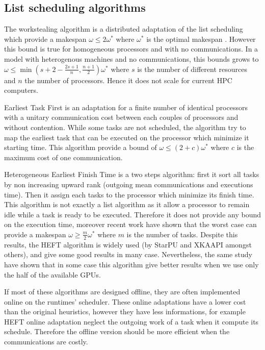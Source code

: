 \documentclass[10pt, conference, compsocconf,pdftex,dvipsnames]{IEEEtran}
\begin{document}
\subsection{List scheduling algorithms}

The workstealing algorithm is a distributed adaptation of the list scheduling
which provide a makespan $\omega\leq2\omega^*$ where $\omega^*$ is the optimal
makespan \cite{GrahamRL1966Bounds, GrahamRL1969Bounds}. However this bound is
true for homogeneous processors and with no communications. In a model with
heterogenous machines and no communications, this bounds grows to
$\omega\leq\min(s+2-\frac{2s+1}{n},\frac{n+1}{2})\omega^*$ where $s$ is the
number of different resources and $n$ the number of processors. Hence it
does not scale for current HPC computers. 

Earliest Task First\cite{hwang1989scheduling} is an adaptation for a finite
number of identical processors with a unitary communication cost between each
couples of processors and without contention. While some tasks are not
scheduled, the algorithm try to map the earliest task that can be executed on
the processor which minimize it starting time. This algorithm provide a bound
of $\omega\leq(2+c)\omega^*$ where $c$ is the maximum cost of one
communication.  

Heterogeneous Earliest Finish Time \cite{topcuoglu2002performance}  is a two
steps algorithm: first it sort all tasks by non increasing upward rank
(outgoing mean communications and executions time). Then it assign each tasks
to the processor which minimize its finish time. This algorithm is not exactly
a list algorithm as it allow a processor to remain idle while a task is ready
to be executed.  Therefore it does not provide any bound on the execution time,
moreover recent work \cite{Kedad-SidhoumMonnaMounieEtAl2013} have shown that
the worst case can provide a makespan $\omega \geq \frac{m}{2}\omega^*$ where
$m$ is the number of tasks. Despite this results, the HEFT algorithm is widely
used (by StarPU and XKAAPI amongst others), and give some good results in many
case\cite{ferreiralima:hal-00735470}. Nevertheless, the same study have shown
that in some case this algorithm give better results when we use only the half
of the available GPUs.

If most of these algorithms are designed offline, they are often implemented
online on the runtimes' scheduler. These online adaptations have a lower cost
than the original heuristics, however they have less informations, for example
HEFT online adaptation neglect the outgoing work of a task when it compute its
schedule. Therefore the offline version should be more efficient when the
communications are costly.
\end{document}
